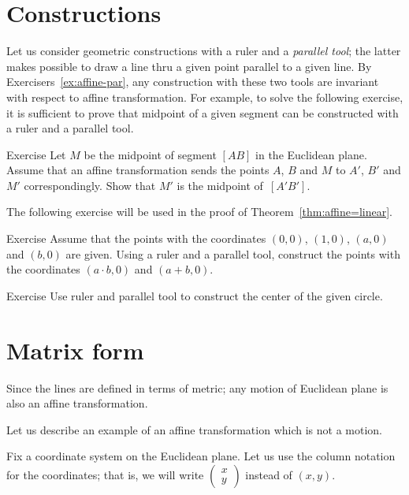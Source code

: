 \section*{Constructions}

Let us consider geometric constructions with a ruler and a \emph{parallel tool};
the latter makes possible to draw a line thru a given point parallel to a given line.
By Exercisers~\ref{ex:affine-par}, any construction with these two tools are invariant with respect to affine transformation.
For example, 
to solve the following exercise,
it is sufficient to prove that midpoint of a given segment can be constructed with a ruler and a parallel tool.

\begin{thm}{Exercise}\label{ex:midpoint-affine}
Let $M$ be the midpoint of segment $[AB]$ in the Euclidean plane.
Assume that an affine transformation sends the points $A$, $B$ and $M$
to $A'$, $B'$ and $M'$ correspondingly.
Show that $M'$ is the midpoint of~$[A'B']$.
\end{thm}

The following exercise will be used in the proof of Theorem~\ref{thm:affine=linear}.

\begin{thm}{Exercise}\label{ex:R-hom}
Assume that the points with the coordinates $(0,0)$, $(1,0)$, $(a,0)$ and $(b,0)$ are given.
Using a ruler and a parallel tool, construct the points with the coordinates $(a\cdot b,0)$ and $(a+b,0)$.
\end{thm}

\begin{thm}{Exercise}\label{ex:center-circ-affine}
Use ruler and parallel tool to construct the center of the given circle.
\end{thm}

\section*{Matrix form}

Since the lines are defined in terms of metric;
any motion of Euclidean plane is also an affine transformation.

Let us describe an example of an affine transformation which is not a motion.

Fix a coordinate system on the Euclidean plane.
Let us use the column notation for the coordinates;
that is, we will write $\left(\begin{smallmatrix}
x\\y
\end{smallmatrix} \right)$ instead of $(x,y)$.

